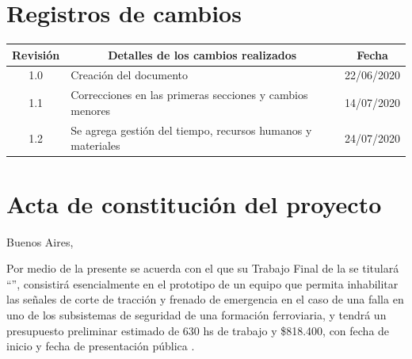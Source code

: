 \documentclass[11pt]{charter}
\begin{document}
\maketitle
\thispagestyle{empty}
\pagebreak


\thispagestyle{empty}
{\setlength{\parskip}{0pt}
\tableofcontents{}
}
\pagebreak


\section{Registros de cambios}
\label{sec:registro}


\begin{table}[ht]
\label{tab:registro}
\centering

\begin{tabularx}{\linewidth}{@{}|c|X|c|@{}}
\hline
\rowcolor[HTML]{C0C0C0} 
Revisión & \multicolumn{1}{c|}{\cellcolor[HTML]{C0C0C0}Detalles de los cambios realizados} & Fecha      \\ \hline
1.0      & Creación del documento                                                          & 22/06/2020 \\ \hline
1.1      & Correcciones en las primeras secciones y cambios menores                        & 14/07/2020 \\ \hline
1.2      & Se agrega gestión del tiempo, recursos humanos y materiales                     & 24/07/2020 \\ \hline
\end{tabularx}
\end{table}

\pagebreak

\section{Acta de constitución del proyecto}
\label{sec:acta}

\begin{flushright}
Buenos Aires, \fechaInicioName
\end{flushright}

\vspace{2cm}

Por medio de la presente se acuerda con el \authorname\hspace{1px} que su Trabajo Final de la \degreename\hspace{1px} 
se titulará ``\ttitle'', consistirá esencialmente en el prototipo de un equipo que permita inhabilitar las señales de 
corte de tracción y frenado de emergencia en el caso de una falla en uno de los subsistemas de seguridad de una 
formación ferroviaria, y tendrá un presupuesto preliminar estimado de 630 hs de trabajo y \$818.400, con 
fecha de inicio \fechaInicioName\hspace{1px} y fecha de presentación pública \fechaFinalName.
\end{document}
